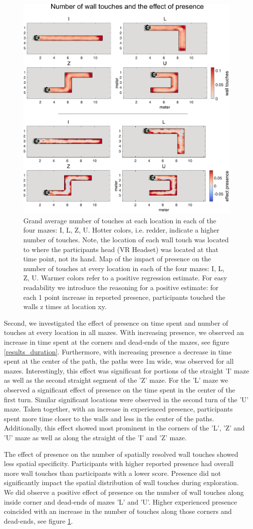 \begin{figure}[h]
\centering
\includegraphics[width=.6\linewidth]{figures/touches.pdf}
\vspace{0pt}
\caption{Grand average number of touches at each location in each of the four mazes: I, L, Z, U. Hotter colors, i.e. redder, indicate a higher number of touches. Note, the location of each wall touch was located to where the participants head (VR Headset) was located at that time point, not its hand. Map of the impact of presence on the number of touches at every location in each of the four mazes: I, L, Z, U. Warmer colors refer to a positive regression estimate. For easy readability we introduce the reasoning for a positive estimate: for each 1 point increase in reported presence, participants touched the walls z times at location xy.}
\label{results_touches}
\end{figure}

Second, we investigated the effect of presence on time spent and number of touches at every location in all mazes. With increasing presence, we observed an increase in time spent at the corners and dead-ends of the mazes, see figure \ref{results_duration}. Furthermore, with increasing presence a decrease in time spent at the center of the path, the paths were 1m wide, was observed for all mazes. Interestingly, this effect was significant for portions of the straight 'I' maze as well as the second straight segment of the 'Z' maze. For the 'L' maze we observed a significant effect of presence on the time spent in the center of the first turn. Similar significant locations were observed in the second turn of the 'U' maze. Taken together, with an increase in experienced presence, participants spent more time closer to the walls and less in the center of the paths. Additionally, this effect showed most prominent in the corners of the 'L', 'Z' and 'U' maze as well as along the straight of the 'I' and 'Z' maze.

The effect of presence on the number of spatially resolved wall touches showed less spatial specificity. Participants with higher reported presence had overall more wall touches than participants with a lower score. Presence did not significantly impact the spatial distribution of wall touches during exploration. We did observe a positive effect of presence on the number of wall touches along inside corner and dead-ends of mazes 'L' and 'U'. Higher experienced presence coincided with an increase in the number of touches along those corners and dead-ends, see figure \ref{results_touches}.